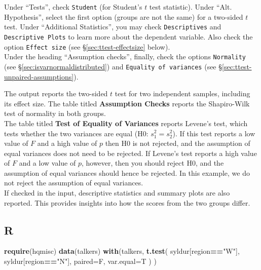 \documentclass[
]{book}
\newenvironment{Shaded}{\begin{snugshade}}{\end{snugshade}}
\newcommand{\DataTypeTok}[1]{\textcolor[rgb]{0.13,0.29,0.53}{#1}}
\newcommand{\KeywordTok}[1]{\textcolor[rgb]{0.13,0.29,0.53}{\textbf{#1}}}
\newcommand{\NormalTok}[1]{#1}
\newcommand{\OperatorTok}[1]{\textcolor[rgb]{0.81,0.36,0.00}{\textbf{#1}}}
\newcommand{\StringTok}[1]{\textcolor[rgb]{0.31,0.60,0.02}{#1}}
\begin{document}
Under ``Tests'', check \texttt{Student} (for Student's \(t\) test statistic). Under ``Alt. Hypothesis'', select the first option (groups are not the same) for a two-sided \(t\) test.
Under ``Additional Statistics'', you may check \texttt{Descriptives} and \texttt{Descriptive\ Plots} to learn more about the dependent variable. Also check the option \texttt{Effect\ size} (see §\ref{sec:ttest-effectsize} below).\\
Under the heading ``Assumption checks'', finally, check the options \texttt{Normality} (see §\ref{sec:isvarnormaldistributed}) and \texttt{Equality\ of\ variances} (see §\ref{sec:ttest-unpaired-assumptions}).

The output reports the two-sided \(t\) test for two independent samples, including its effect size.
The table titled \textbf{Assumption Checks} reports the Shapiro-Wilk test of normality in both groups.\\
The table titled \textbf{Test of Equality of Variances} reports Levene's test, which tests whether the two variances are equal (H0: \(s^2_1 = s^2_2\)). If this test reports a low value of \(F\) and a high value of \(p\) then H0 is not rejected, and the assumption of equal variances does not need to be rejected. If Levene's test reports a high value of \(F\) and a low value of \(p\), however, then you should reject H0, and the assumption of equal variances should hence be rejected. In this example, we do not reject the assumption of equal variances.\\
If checked in the input, descriptive statistics and summary plots are also reported. This provides insights into how the scores from the two groups differ.

\hypertarget{sec:R-ttest-unpaired}{%
\subsection{R}\label{sec:R-ttest-unpaired}}

\begin{Shaded}
\begin{Highlighting}[]
\KeywordTok{require}\NormalTok{(hqmisc)}
\KeywordTok{data}\NormalTok{(talkers)}
\KeywordTok{with}\NormalTok{(talkers, }\KeywordTok{t.test}\NormalTok{( syldur[region}\OperatorTok{==}\StringTok{"W"}\NormalTok{], syldur[region}\OperatorTok{==}\StringTok{"N"}\NormalTok{], }
            \DataTypeTok{paired=}\NormalTok{F, }\DataTypeTok{var.equal=}\NormalTok{T ) )}
\end{Highlighting}
\end{Shaded}
\end{document}
